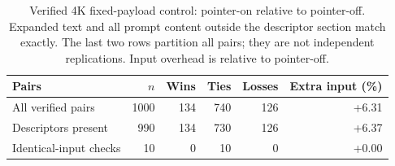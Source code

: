 \begin{table}[htbp]
\centering
\small
\setlength{\tabcolsep}{4pt}
\caption{Verified 4K fixed-payload control: pointer-on relative to pointer-off. Expanded text and all prompt content outside the descriptor section match exactly. The last two rows partition all pairs; they are not independent replications. Input overhead is relative to pointer-off.}
\label{tab:control}
\begin{tabular}{lrrrrr}
\toprule
Pairs & $n$ & Wins & Ties & Losses & Extra input (\%) \\
\midrule
All verified pairs & 1000 & 134 & 740 & 126 & +6.31 \\
Descriptors present & 990 & 134 & 730 & 126 & +6.37 \\
Identical-input checks & 10 & 0 & 10 & 0 & +0.00 \\
\bottomrule
\end{tabular}
\end{table}
